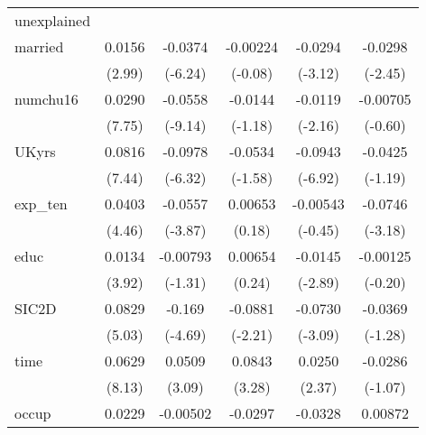 \begin{table}[htbp]
\begin{tabular}{l*{5}{c}}
\hline
unexplained &                     &                     &                     &                     &                     \\
married     &      0.0156\sym{**} &     -0.0374\sym{***}&    -0.00224         &     -0.0294\sym{**} &     -0.0298\sym{*}  \\
            &      (2.99)         &     (-6.24)         &     (-0.08)         &     (-3.12)         &     (-2.45)         \\
numchu16    &      0.0290\sym{***}&     -0.0558\sym{***}&     -0.0144         &     -0.0119\sym{*}  &    -0.00705         \\
            &      (7.75)         &     (-9.14)         &     (-1.18)         &     (-2.16)         &     (-0.60)         \\
UKyrs       &      0.0816\sym{***}&     -0.0978\sym{***}&     -0.0534         &     -0.0943\sym{***}&     -0.0425         \\
            &      (7.44)         &     (-6.32)         &     (-1.58)         &     (-6.92)         &     (-1.19)         \\
exp\_ten     &      0.0403\sym{***}&     -0.0557\sym{***}&     0.00653         &    -0.00543         &     -0.0746\sym{**} \\
            &      (4.46)         &     (-3.87)         &      (0.18)         &     (-0.45)         &     (-3.18)         \\
educ        &      0.0134\sym{***}&    -0.00793         &     0.00654         &     -0.0145\sym{**} &    -0.00125         \\
            &      (3.92)         &     (-1.31)         &      (0.24)         &     (-2.89)         &     (-0.20)         \\
SIC2D       &      0.0829\sym{***}&      -0.169\sym{***}&     -0.0881\sym{*}  &     -0.0730\sym{**} &     -0.0369         \\
            &      (5.03)         &     (-4.69)         &     (-2.21)         &     (-3.09)         &     (-1.28)         \\
time        &      0.0629\sym{***}&      0.0509\sym{**} &      0.0843\sym{**} &      0.0250\sym{*}  &     -0.0286         \\
            &      (8.13)         &      (3.09)         &      (3.28)         &      (2.37)         &     (-1.07)         \\
occup       &      0.0229\sym{***}&    -0.00502         &     -0.0297         &     -0.0328\sym{***}&     0.00872         \\

\end{tabular}
\end{table}
